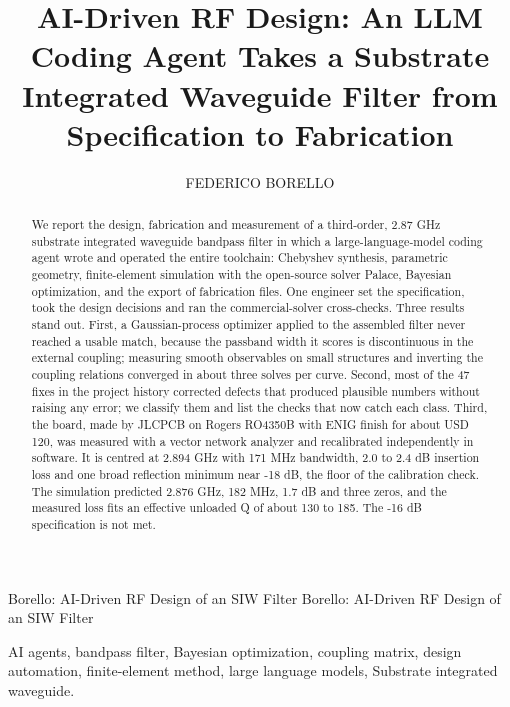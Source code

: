\documentclass{ieeeaccess}
\begin{document}

\title{AI-Driven RF Design: An LLM Coding Agent Takes a Substrate Integrated Waveguide Filter from Specification to Fabrication}
\author{\uppercase{Federico Borello}}
\address[1]{Universidad Tecnol\'ogica Nacional, Facultad Regional Buenos Aires,
Buenos Aires, Argentina (e-mail: fborello.contact@gmail.com)}

\markboth
{Borello: AI-Driven RF Design of an SIW Filter}
{Borello: AI-Driven RF Design of an SIW Filter}


\begin{abstract}
We report the design, fabrication and measurement of a third-order, 2.87 GHz substrate integrated waveguide bandpass filter in which a large-language-model coding agent wrote and operated the entire toolchain: Chebyshev synthesis, parametric geometry, finite-element simulation with the open-source solver Palace, Bayesian optimization, and the export of fabrication files. One engineer set the specification, took the design decisions and ran the commercial-solver cross-checks. Three results stand out. First, a Gaussian-process optimizer applied to the assembled filter never reached a usable match, because the passband width it scores is discontinuous in the external coupling; measuring smooth observables on small structures and inverting the coupling relations converged in about three solves per curve. Second, most of the 47 fixes in the project history corrected defects that produced plausible numbers without raising any error; we classify them and list the checks that now catch each class. Third, the board, made by JLCPCB on Rogers RO4350B with ENIG finish for about USD 120, was measured with a vector network analyzer and recalibrated independently in software. It is centred at 2.894 GHz with 171 MHz bandwidth, 2.0 to 2.4 dB insertion loss and one broad reflection minimum near -18 dB, the floor of the calibration check. The simulation predicted 2.876 GHz, 182 MHz, 1.7 dB and three zeros, and the measured loss fits an effective unloaded Q of about 130 to 185. The -16 dB specification is not met.
\end{abstract}

\begin{keywords}
AI agents, bandpass filter, Bayesian optimization, coupling matrix, design automation, finite-element method, large language models, Substrate integrated waveguide.
\end{keywords}
\end{document}
